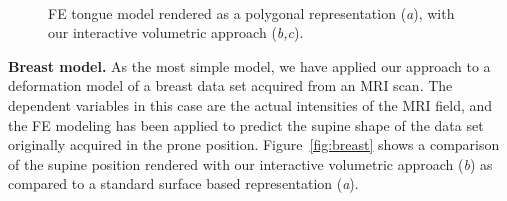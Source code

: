 \documentclass[review,journal]{vgtc}         %
\begin{document}
\begin{figure}[t]
    \centering 
    \\
    \caption{FE tongue model rendered as a polygonal representation ({\it a}), with our interactive volumetric approach ({\it b,c}).}
    \label{fig:tongue}
\end{figure}

\noindent \textbf{Breast model.} As the most simple model, we have applied our approach to a deformation model of a breast data set acquired from an MRI scan. The dependent variables in this case are the actual intensities of the MRI field, and the FE modeling has been applied to predict the supine shape of the data set originally acquired in the prone position. Figure~\ref{fig:breast} shows a comparison of the supine position rendered with our interactive volumetric approach ({\it b}) as compared to a standard surface based representation ({\it a}).
\end{document}
